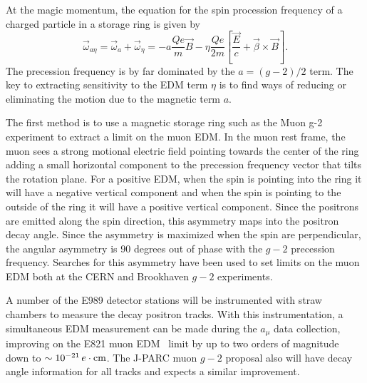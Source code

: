 




At the magic momentum, the equation for the spin procession frequency of a charged particle in a storage ring is given by
\begin{equation}
\vec{\omega}_{a\eta}= \vec \omega_a + \vec \omega_\eta = -
 a \frac {Qe}  {m}
 \vec{B}
 -  \eta \frac {Qe}{2m}
 \left[ \frac {\vec{E}} {c}  +  \vec{\beta} \times \vec{B} \right] .
 \label{eq:omegaa-edm1}
\end{equation}
The precession frequency is by far dominated by the $a= (g-2)/2$ term.  
The key to extracting sensitivity to the EDM term $\eta$ is to find ways of reducing or eliminating the motion due to the magnetic term $a$. 

The first method is to use a magnetic storage ring such as the Muon g-2 experiment to extract a 
limit on the muon EDM.  In the muon rest frame, the muon sees a strong motional electric field
 pointing towards the center of the ring adding a small horizontal component to the precession 
 frequency vector that tilts the rotation plane.  For a positive EDM, when the spin is pointing into the 
 ring it will have a negative vertical component and when the spin is pointing to the outside of the ring 
 it will have a positive vertical component.  Since the positrons are emitted along the spin direction, 
 this asymmetry maps into the positron decay angle. Since the asymmetry is maximized when the spin 
 are perpendicular, the angular asymmetry is 90 degrees out of phase with the $g-2$ precession frequency.  
Searches for this asymmetry have been used to set limits on the muon EDM both at the CERN and Brookhaven $g-2$ experiments. 

 A number of the E989 detector stations will
be instrumented with straw chambers to measure the decay positron
tracks. With this instrumentation, a simultaneous EDM
measurement can be made during the $a_\mu$ data collection,
improving on the  E821 muon EDM~\cite{Bennett08-edm}
 limit by up to two orders of magnitude down to
$\sim 10^{-21}\,  e \cdot {\rm cm}$.   The J-PARC muon $g-2$ proposal also
 will have decay angle information for all tracks and expects a similar improvement.

